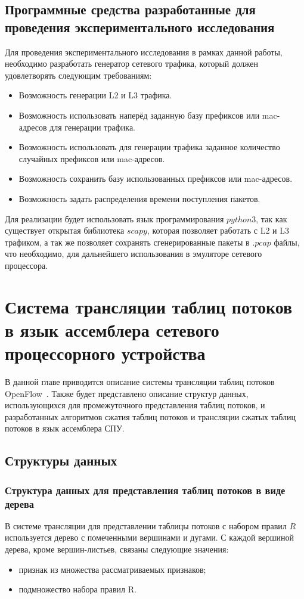 \documentclass[oneside,final,12pt]{extarticle}
\begin{document}
        \subsection{Программные средства разработанные для проведения экспериментального исследования}
            Для проведения экспериментального исследования в рамках данной работы, необходимо разработать генератор сетевого трафика, который должен удовлетворять следующим требованиям:
            \begin{itemize}
                \item Возможность генерации L2 и L3 трафика.
                \item Возможность использовать наперёд заданную базу префиксов или mac-адресов для генерации трафика.
                \item Возможность использовать для генерации трафика заданное количество случайных префиксов или mac-адресов.
                \item Возможность сохранить базу использованных префиксов или mac-адресов.
                \item Возможность задать распределения времени поступления пакетов.
            \end{itemize}
            Для реализации будет использовать язык программирования $python3$, так как существует открытая библиотека $scapy$, которая позволяет работать с L2 и L3 трафиком,
            а так же позволяет сохранять сгенерированные пакеты в $.pcap$ файлы, что необходимо, для дальнейшего использования в эмуляторе сетевого процессора.
    \section{Система трансляции таблиц потоков в язык ассемблера сетевого процессорного устройства}
        В данной главе приводится описание системы трансляции таблиц потоков OpenFlow~\cite{andrewmonetec}. Также будет представлено описание
        структур данных, использующихся для промежуточного представления таблиц потоков, и разработанных алгоритмов сжатия таблиц потоков и трансляции
        сжатых таблиц потоков в язык ассемблера СПУ.
        \subsection {Структуры данных}
            \subsubsection {Структура данных для представления таблиц потоков в виде дерева}
                В системе трансляции для представлении таблицы потоков с набором правил \(R\) используется дерево с помеченными вершинами и дугами.
                С каждой вершиной дерева, кроме вершин-листьев, связаны следующие значения:
                \begin{itemize}
                    \item признак из множества рассматриваемых признаков;
                    \item подмножество набора правил R.
                \end{itemize}
\end{document}
